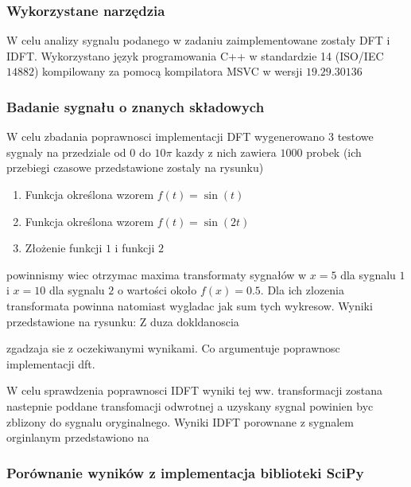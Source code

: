 \documentclass{artikel3}
\begin{document}
\subsubsection{Wykorzystane narzędzia}

W celu analizy sygnalu podanego w zadaniu zaimplementowane zostały DFT i IDFT. Wykorzystano język programowania C++ w standardzie 14 (ISO/IEC $14882$) kompilowany za pomocą kompilatora MSVC w wersji $19.29.30136$

\subsubsection{Badanie sygnału o znanych składowych}

W celu zbadania poprawnosci implementacji DFT wygenerowano 3 testowe sygnaly na przedziale od $0$ do $10 \pi$ kazdy z nich zawiera $1000$ probek (ich przebiegi czasowe przedstawione zostaly na rysunku) %

\begin{enumerate}
    \item Funkcja określona wzorem $f(t) = \sin(t)$
    \item Funkcja określona wzorem $f(t) = \sin(2t)$
    \item Złożenie funkcji $1$ i funkcji $2$
\end{enumerate}

powinnismy wiec otrzymac maxima transformaty sygnałów w $x=5$ dla sygnalu $1$ i $x=10$ dla sygnalu $2$ o wartości około $f(x)=0.5$. Dla ich zlozenia transformata powinna natomiast wygladac jak sum tych wykresow. Wyniki przedstawione na rysunku: 
Z duza dokldanoscia 

zgadzaja sie z oczekiwanymi wynikami. Co argumentuje poprawnosc implementacji dft.

W celu sprawdzenia poprawnosci IDFT wyniki tej ww. transformacji zostana nastepnie poddane transfomacji odwrotnej a uzyskany sygnal powinien byc zblizony do sygnalu oryginalnego. Wyniki IDFT porownane z sygnalem orginlanym przedstawiono na 


\subsubsection{Porównanie wyników z implementacja biblioteki SciPy}
\end{document}
